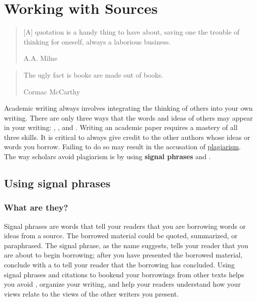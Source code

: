 
\hypertarget{sources}{}


\chapter{Working with Sources}

\begin{quote} \small [A] quotation is a handy thing to have about, saving one the trouble of thinking for oneself, always a laborious business.

\textemdash A.A. Milne
\end{quote}

\begin{quote} \small The ugly fact is books are made out of books.

\textemdash Cormac McCarthy

\end{quote}

Academic writing always involves integrating the thinking of others into your own writing. There are only three ways that the words and ideas
of others may appear in your writing: \hyperlink{summary}{\color{Ahrenge}{summary}}, \hyperlink{paraphrase}{\color{Ahrenge}{paraphrase}}, and \hyperlink{quotation}{\color{Ahrenge}{quotation}}. Writing an academic paper requires a mastery of
all three skills. It is critical to always give credit to the other
authors whose ideas or words you borrow. Failing to do so may result in the
accusation of \hyperlink{plagiarism}{\color{Ahrenge}plagiarism}. The way scholars 
avoid plagiarism is by using \textbf{signal phrases} and \hyperlink{citation}{\color{Ahrenge}{citations}}.

\hypertarget{signalphrase}{}
\section{Using signal phrases}


\subsection{What are they?}

Signal phrases are words that tell your readers that you are borrowing words or ideas from a source. The borrowed material could be quoted, summarized, or paraphrased. The signal phrase, as the name suggests, tells your reader that you are about to begin borrowing; after you have presented the borrowed material, conclude with a \hyperlink{citation}{\color{Ahrenge}{citation}} to tell your reader that the borrowing has concluded. Using signal phrases and citations to bookend your borrowings from other texts helps you avoid \hyperlink{plagiarism}{\color{Ahrenge}{plagiarism}}, organize your writing, and help your readers understand how your views relate to the views of the other writers you present.

